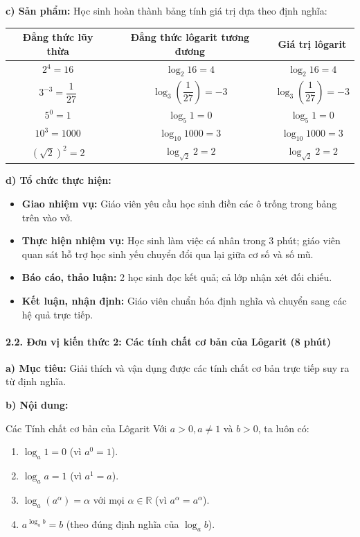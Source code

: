 \documentclass[12pt, a4paper]{article}
\begin{document}
\noindent \textbf{c) Sản phẩm:}
Học sinh hoàn thành bảng tính giá trị dựa theo định nghĩa:
\begin{center}
\begin{tabular}{|c|c|c|}
    \hline
    \textbf{Đẳng thức lũy thừa} & \textbf{Đẳng thức lôgarit tương đương} & \textbf{Giá trị lôgarit} \\ \hline
    $2^4 = 16$ & $\log_2 16 = 4$ & $\log_2 16 = 4$ \\ \hline
    $3^{-3} = \dfrac{1}{27}$ & $\log_3 \left(\dfrac{1}{27}\right) = -3$ & $\log_3 \left(\dfrac{1}{27}\right) = -3$ \\ \hline
    $5^0 = 1$ & $\log_5 1 = 0$ & $\log_5 1 = 0$ \\ \hline
    $10^3 = 1000$ & $\log_{10} 1000 = 3$ & $\log_{10} 1000 = 3$ \\ \hline
    $(\sqrt{2})^2 = 2$ & $\log_{\sqrt{2}} 2 = 2$ & $\log_{\sqrt{2}} 2 = 2$ \\ \hline
\end{tabular}
\end{center}

\noindent \textbf{d) Tổ chức thực hiện:}
\begin{itemize}[leftmargin=0.6cm]
    \item \textbf{Giao nhiệm vụ:} Giáo viên yêu cầu học sinh điền các ô trống trong bảng trên vào vở.
    \item \textbf{Thực hiện nhiệm vụ:} Học sinh làm việc cá nhân trong 3 phút; giáo viên quan sát hỗ trợ học sinh yếu chuyển đổi qua lại giữa cơ số và số mũ.
    \item \textbf{Báo cáo, thảo luận:} 2 học sinh đọc kết quả; cả lớp nhận xét đối chiếu.
    \item \textbf{Kết luận, nhận định:} Giáo viên chuẩn hóa định nghĩa và chuyển sang các hệ quả trực tiếp.
\end{itemize}

\paragraph{2.2. Đơn vị kiến thức 2: Các tính chất cơ bản của Lôgarit (8 phút)}

\noindent \textbf{a) Mục tiêu:}
Giải thích và vận dụng được các tính chất cơ bản trực tiếp suy ra từ định nghĩa.

\noindent \textbf{b) Nội dung:}
\begin{pedabox}{Các Tính chất cơ bản của Lôgarit}
Với $a > 0, a \neq 1$ và $b > 0$, ta luôn có:
\begin{enumerate}[leftmargin=0.6cm]
    \item $\log_a 1 = 0$ (vì $a^0 = 1$).
    \item $\log_a a = 1$ (vì $a^1 = a$).
    \item $\log_a (a^\alpha) = \alpha$ với mọi $\alpha \in \mathbb{R}$ (vì $a^\alpha = a^\alpha$).
    \item $a^{\log_a b} = b$ (theo đúng định nghĩa của $\log_a b$).
\end{enumerate}
\end{pedabox}
\end{document}
